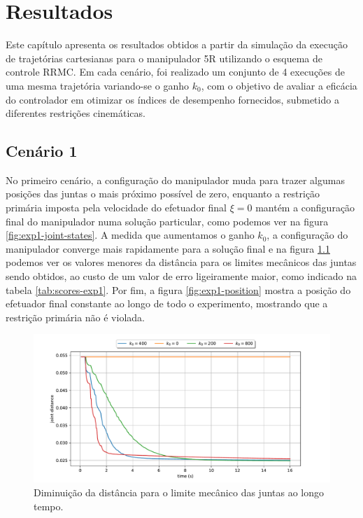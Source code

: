 \chapter{Resultados}\label{cap:results}

Este capítulo apresenta os resultados obtidos a partir da simulação da 
execução de trajetórias cartesianas para o manipulador 5R utilizando o esquema 
de controle RRMC. Em cada cenário, foi realizado um conjunto de 4 execuções de 
uma mesma trajetória variando-se o ganho \(k_0\), com o objetivo de avaliar 
a eficácia do controlador em otimizar os índices de desempenho fornecidos, submetido 
a diferentes restrições cinemáticas.

\section{Cenário 1}

No primeiro cenário, a configuração do manipulador muda para trazer algumas posições 
das juntas o mais próximo possível de zero, enquanto a restrição primária imposta pela velocidade 
do efetuador final \(\xi = 0\) mantém a configuração final do manipulador numa solução particular, 
como podemos ver na figura \ref*{fig:exp1-joint-states}. A medida que aumentamos o ganho \(k_0\), a 
configuração do manipulador converge mais rapidamente para a solução final e na figura \ref*{fig:exp1-metric} 
podemos ver os valores menores da distância para os limites mecânicos das juntas sendo obtidos, ao custo 
de um valor de erro ligeiramente maior, como indicado na tabela \ref*{tab:scores-exp1}. Por fim, a figura 
\ref*{fig:exp1-position} mostra a posição do efetuador final constante ao longo de todo o experimento, 
mostrando que a restrição primária não é violada.

\begin{figure}
	\centering
	\includegraphics[width=\textwidth]{./Images/2024-06-11-09-23-42/metric_joint_distance.pdf}
	\caption{Diminuição da distância para o limite mecânico das juntas ao longo tempo.}\label{fig:exp1-metric}
\end{figure}

